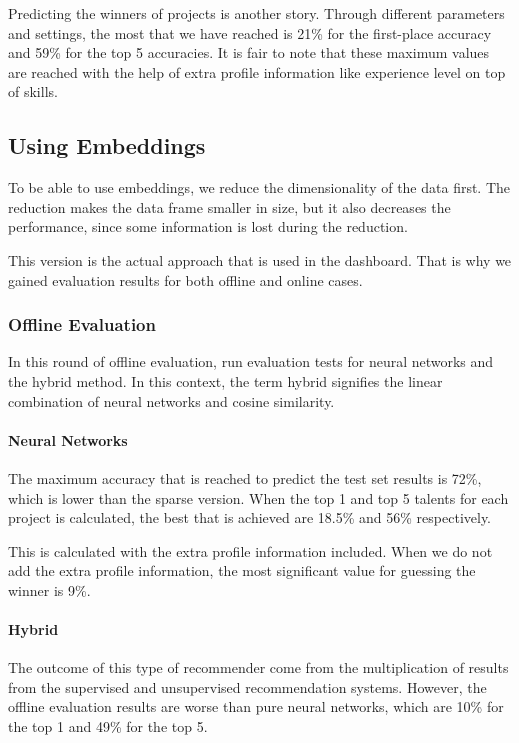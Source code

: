 Predicting the winners of projects is another story. Through different parameters and settings, the most that we have reached is 21\% for the first-place accuracy and 59\% for the top 5 accuracies. It is fair to note that these maximum values are reached with the help of extra profile information like experience level on top of skills.

\subsection{Using Embeddings}

To be able to use embeddings, we reduce the dimensionality of the data first. The reduction makes the data frame smaller in size, but it also decreases the performance, since some information is lost during the reduction. 

This version is the actual approach that is used in the dashboard. That is why we gained evaluation results for both offline and online cases. 

\subsubsection{Offline Evaluation}

In this round of offline evaluation, run evaluation tests for neural networks and the hybrid method. In this context, the term hybrid signifies the linear combination of neural networks and cosine similarity.

\paragraph{Neural Networks}

The maximum accuracy that is reached to predict the test set results is 72\%, which is lower than the sparse version. When the top 1 and top 5 talents for each project is calculated, the best that is achieved are 18.5\% and 56\% respectively. 

This is calculated with the extra profile information included. When we do not add the extra profile information, the most significant value for guessing the winner is 9\%.

\paragraph{Hybrid}

The outcome of this type of recommender come from the multiplication of results from the supervised and unsupervised recommendation systems. However, the offline evaluation results are worse than pure neural networks, which are 10\% for the top 1 and 49\% for the top 5.

